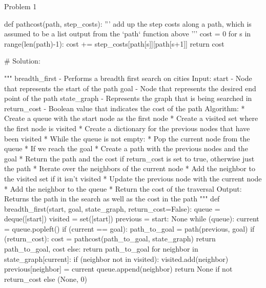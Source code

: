 \begin{problem}{Problem 1}
\begin{highlight}[Solution]
\begin{code}[Python]
    def pathcost(path, step_costs):
        '''
        add up the step costs along a path, which is assumed to be a list output from the `path` function above
        '''
        cost = 0
        for s in range(len(path)-1):
            cost += step_costs[path[s]][path[s+1]]
        return cost
    
    
    # Solution:
    
    """ breadth_first - Performs a breadth first search on cities
        Input:
            start - Node that represents the start of the path
            goal - Node that represents the desired end point of the path
            state_graph - Represents the graph that is being searched in
            return_cost - Boolean value that indicates the cost of the path
        Algorithm:
            * Create a queue with the start node as the first node
            * Create a visited set where the first node is visited
            * Create a dictionary for the previous nodes that have been visited
            * While the queue is not empty:
                * Pop the current node from the queue
                * If we reach the goal
                    * Create a path with the previous nodes and the goal
                    * Return the path and the cost if return_cost is set to true, otherwise just the path
                * Iterate over the neighbors of the current node
                * Add the neighbor to the visited set if it isn't visited
                * Update the previous node with the current node
                * Add the neighbor to the queue
            * Return the cost of the traversal
        Output:
            Returns the path in the search as well as the cost in the path
    """
    def breadth_first(start, goal, state_graph, return_cost=False):
        queue = deque([start])
        visited = set([start])
        previous = {start: None}
        while (queue):
            current = queue.popleft()
            if (current == goal):
                path_to_goal = path(previous, goal)
                if (return_cost):
                    cost = pathcost(path_to_goal, state_graph)
                    return path_to_goal, cost
                else:
                    return path_to_goal
            for neighbor in state_graph[current]:
                if (neighbor not in visited):
                    visited.add(neighbor)
                    previous[neighbor] = current
                    queue.append(neighbor)
        return None if not return_cost else (None, 0)
    \end{code}
    \end{highlight}
\end{problem}

